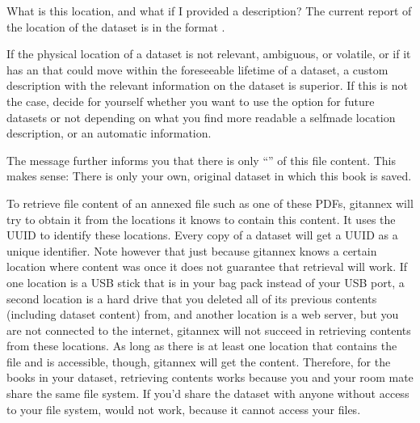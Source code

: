 \begin{findoutmore}[label={fom-clone-description}, before title={\thetcbcounter\ }, float, floatplacement=tb, check odd page=true]{What is this location, and what if I provided a description?}
\sphinxAtStartPar
The current report of the location of the dataset is in the format
.

\sphinxAtStartPar
If the physical location of a dataset is not relevant, ambiguous, or volatile,
or if it has an {\hyperref[\detokenize{glossary:term-annex}]{}} that could move within the foreseeable lifetime of a
dataset, a custom description with the relevant information on the dataset is
superior. If this is not the case, decide for yourself whether you want to use
the  option for future datasets or not depending on what you
find more readable \textendash{} a self\sphinxhyphen{}made location description, or an automatic
 information.


\end{findoutmore}

\sphinxAtStartPar
The message further informs you that there is only “” of this file content.
This makes sense: There is only your own, original  dataset in which this book is saved.

\sphinxAtStartPar
To retrieve file content of an annexed file such as one of these PDFs, git\sphinxhyphen{}annex will try to obtain it from the locations it knows to contain this content.
It uses the UUID to identify these locations.
Every copy of a dataset will get a UUID as a unique identifier.
Note however that just because git\sphinxhyphen{}annex knows a certain location where content was once it does not guarantee that retrieval will work.
If one location is a USB stick that is in your bag pack instead of your USB port, a second location is a hard drive that you deleted all of its previous contents (including dataset content) from,
and another location is a web server, but you are not connected to the internet, git\sphinxhyphen{}annex will not succeed in retrieving contents from these locations.
As long as there is at least one location that contains the file and is accessible, though, git\sphinxhyphen{}annex will get the content.
Therefore, for the books in your dataset, retrieving contents works because you and your room mate share the same file system.
If you’d share the dataset with anyone without access to your file system,  would not work, because it cannot access your files.

